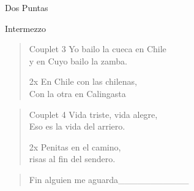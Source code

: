 \begin{song}[cuenca]{Dos Puntas}
\begin{instrumental}{Intermezzo}
\measure{}\measure{}\measure{}\measure{}\measure{}
\end{instrumental}

\begin{verse}{Couplet 3}
Yo bailo la cueca en Chile\\
y en Cuyo bailo la zamba.\\
\begin{sidenote}{2x}
En Chile con las chilenas,\\
Con la otra en Calingasta
\end{sidenote}
\end{verse}

\begin{verse}{Couplet 4}
Vida triste, vida alegre,\\
Eso es la vida del arriero.\\
\begin{sidenote}{2x}
Penitas en el camino,\\
risas al fin del sendero.
\end{sidenote}
\end{verse}

\begin{verse}{Fin}
alguien me  aguarda\_\_\_\_\_\_\_\_\_\_\_
\end{verse}
\end{song}


